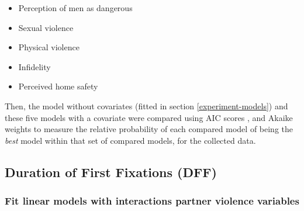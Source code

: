 \documentclass[
  bookmarksnumbered]{article}
\providecommand{\tightlist}{%
  \setlength{\itemsep}{0pt}\setlength{\parskip}{0pt}}
\begin{document}
\begin{itemize}
\tightlist
\item
  Perception of men as dangerous
\item
  Sexual violence
\item
  Physical violence
\item
  Infidelity
\item
  Perceived home safety
\end{itemize}

Then, the model without covariates (fitted in section \ref{experiment-models}) and these five models with a covariate were compared using AIC scores \autocite{akaikeInformationTheoryExtension1998,akaikeNewLookStatistical1974}, and Akaike weights \autocites[see e.g.,][]{wagenmakersAICModelSelection2004,portetPrimerModelSelection2020} to measure the relative probability of each compared model of being the \emph{best} model within that set of compared models, for the collected data.

\subsection{Duration of First Fixations (DFF)}\label{duration-of-first-fixations-dff-1}

\subsubsection{Fit linear models with interactions partner violence variables}\label{fit-linear-models-with-interactions-partner-violence-variables}
\end{document}
